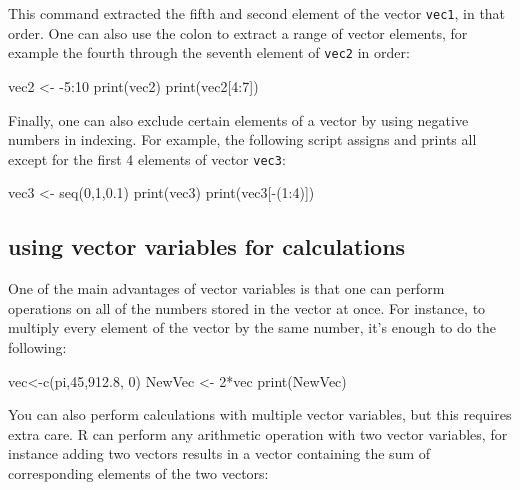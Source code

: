 \documentclass[
  letterpaper,
  DIV=11,
  numbers=noendperiod]{scrreprt}
\newenvironment{Shaded}{\begin{snugshade}}{\end{snugshade}}
\newcommand{\NormalTok}[1]{\textcolor[rgb]{0.00,0.23,0.31}{#1}}
\begin{document}
This command extracted the fifth and second element of the vector
\texttt{vec1}, in that order. One can also use the colon to extract a
range of vector elements, for example the fourth through the seventh
element of \texttt{vec2} in order:

\begin{Shaded}
\begin{Highlighting}[]
\NormalTok{vec2 \textless{}{-} {-}5:10}
\NormalTok{print(vec2)}
\NormalTok{print(vec2[4:7])}
\end{Highlighting}
\end{Shaded}

Finally, one can also exclude certain elements of a vector by using
negative numbers in indexing. For example, the following script assigns
and prints all except for the first 4 elements of vector \texttt{vec3}:

\begin{Shaded}
\begin{Highlighting}[]
\NormalTok{vec3 \textless{}{-} seq(0,1,0.1)}
\NormalTok{print(vec3)}
\NormalTok{print(vec3[{-}(1:4)])}
\end{Highlighting}
\end{Shaded}

\hypertarget{using-vector-variables-for-calculations}{%
\subsection*{using vector variables for
calculations}\label{using-vector-variables-for-calculations}}

One of the main advantages of vector variables is that one can perform
operations on all of the numbers stored in the vector at once. For
instance, to multiply every element of the vector by the same number,
it's enough to do the following:

\begin{Shaded}
\begin{Highlighting}[]
\NormalTok{vec\textless{}{-}c(pi,45,912.8, 0)}
\NormalTok{NewVec \textless{}{-} 2*vec}
\NormalTok{print(NewVec)}
\end{Highlighting}
\end{Shaded}

You can also perform calculations with multiple vector variables, but
this requires extra care. R can perform any arithmetic operation with
two vector variables, for instance adding two vectors results in a
vector containing the sum of corresponding elements of the two vectors:
\end{document}
